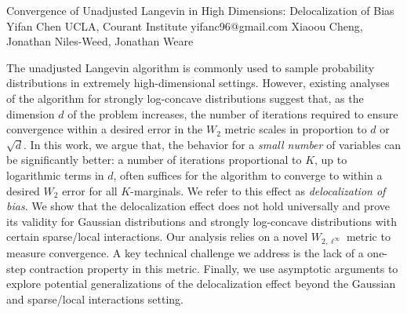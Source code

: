 \begin{talk}
\medskip


\end{talk}

\begin{talk}
  {Convergence of Unadjusted Langevin in High Dimensions: Delocalization of Bias}%
  {Yifan Chen}%
  {UCLA, Courant Institute}%
  {yifanc96@gmail.com}%
  {Xiaoou Cheng, Jonathan Niles-Weed, Jonathan Weare}%
  
    
   
The unadjusted Langevin algorithm is commonly used to sample probability distributions in extremely high-dimensional settings. However, existing analyses of the algorithm for strongly log-concave distributions suggest that, as the dimension $d$ of the problem increases, the number of iterations required to ensure convergence within a desired error in the $W_2$ metric scales in proportion to $d$ or $\sqrt{d}$. In this work, we argue that, the behavior for a \emph{small number} of variables can be significantly better: a number of iterations proportional to $K$, up to logarithmic terms in $d$,
often suffices for the algorithm to converge to within a desired $W_2$ error for all $K$-marginals.
We refer to this effect as 
\textit{delocalization of bias}. 
We show that the delocalization effect does not hold universally and prove its validity for Gaussian distributions and strongly log-concave distributions with certain sparse/local interactions. Our analysis relies on a novel $W_{2,\ell^\infty}$ metric to measure convergence. A key technical challenge we address is the lack of a one-step contraction property in this metric. Finally, we use asymptotic arguments to explore potential generalizations of the delocalization effect beyond the Gaussian and sparse/local interactions setting.

\end{talk}


